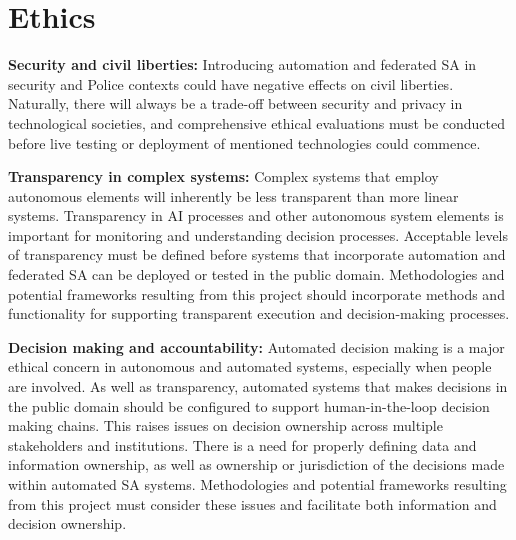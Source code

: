 \chapter{Ethics}


\hspace{\parindent} \textbf{Security and civil liberties:}
Introducing automation and federated SA in security and Police contexts could have negative effects on civil liberties. Naturally, there will always be a trade-off between security and privacy in technological societies, and comprehensive ethical evaluations must be conducted before live testing or deployment of mentioned technologies could commence.

\textbf{Transparency in complex systems:}
Complex systems that employ autonomous elements will inherently be less transparent than more linear systems. Transparency in AI processes and other autonomous system elements is important for monitoring and understanding decision processes. Acceptable levels of transparency must be defined before systems that incorporate automation and federated SA can be deployed or tested in the public domain. Methodologies and potential frameworks resulting from this project should incorporate methods and functionality for supporting transparent execution and decision-making processes. 

\textbf{Decision making and accountability:}
Automated decision making is a major ethical concern in autonomous and automated systems, especially when people are involved. As well as transparency, automated systems that makes decisions in the public domain should be configured to support human-in-the-loop decision making chains. This raises issues on decision ownership across multiple stakeholders and institutions. There is a need for properly defining data and information ownership, as well as ownership or jurisdiction of the decisions made within automated SA systems. Methodologies and potential frameworks resulting from this project must consider these issues and facilitate both information and decision ownership.
